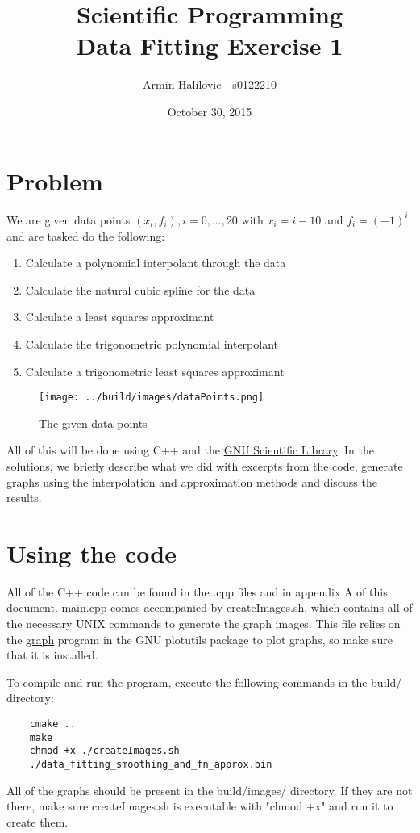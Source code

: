 \documentclass[11pt, a4paper, titlepage, openright]{article}
\title{\LARGE Scientific Programming \\ \normalsize Data Fitting Exercise 1}
\author{Armin Halilovic - s0122210}
\date{October 30, 2015}
\begin{document}

\onecolumn
\tableofcontents
\newpage



\section{Problem}
    We are given data points \( (x_i, f_i), i = 0, ..., 20 \) with \( x_i = i - 10 \) and \( f_i = (-1)^i \) and are tasked do the following:
    \begin{enumerate}
        \item Calculate a polynomial interpolant through the data
        \item Calculate the natural cubic spline for the data
        \item Calculate a least squares approximant
        \item Calculate the trigonometric polynomial interpolant
        \item Calculate a trigonometric least squares approximant
    \end{enumerate}

    \begin{figure}[H]
        \centering
        \texttt{[image: ../build/images/dataPoints.png]}
        \caption{The given data points}
        \label{fig:datapoints}
    \end{figure}

    All of this will be done using C++ and the \href{http://www.gnu.org/software/gsl/}{GNU Scientific Library}.
    In the solutions, we briefly describe what we did with excerpts from the code, generate graphs using the interpolation and approximation methods and discuss the results.

\section{Using the code}
    All of the C++ code can be found in the .cpp files and in appendix A of this document.
    main.cpp comes accompanied by createImages.sh, which contains all of the necessary UNIX commands to generate the graph images.
    This file relies on the \href{https://www.gnu.org/software/plotutils/manual/en/html_node/graph.html}{graph} program
    in the GNU plotutils package to plot graphs, so make sure that it is installed.

    To compile and run the program, execute the following commands in the build/ directory:
    \begin{lstlisting}
    cmake ..
    make
    chmod +x ./createImages.sh
    ./data_fitting_smoothing_and_fn_approx.bin
    \end{lstlisting}
    All of the graphs should be present in the build/images/ directory. If they are not there, make sure createImages.sh is
    executable with "chmod +x" and run it to create them.
\end{document}
